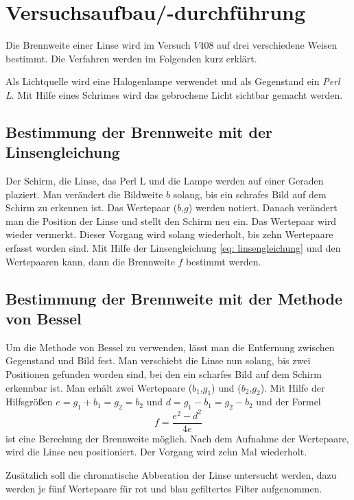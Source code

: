 \section{Versuchsaufbau/-durchführung}
Die Brennweite einer Linse wird im Versuch $V408$ auf drei
verschiedene Weisen bestimmt.
Die Verfahren werden im Folgenden kurz erklärt.

Als Lichtquelle wird eine Halogenlampe verwendet und als
Gegenstand ein \emph{Perl L}. Mit Hilfe eines Schrimes wird
das gebrochene Licht sichtbar gemacht werden.

\subsection{Bestimmung der Brennweite mit der Linsengleichung}

Der Schirm, die Linse, das Perl L und die Lampe werden auf einer
Geraden plaziert.
Man verändert die Bildweite $b$ solang, bis ein schrafes Bild auf dem
Schirm zu erkennen ist. Das Wertepaar ($b$,$g$) werden notiert.
Danach verändert man die Position der Linse und stellt den Schirm neu ein.
Das Wertepaar wird wieder vermerkt. Dieser Vorgang wird solang wiederholt, bis
zehn Wertepaare erfasst worden sind.
Mit Hilfe der Linsengleichung \eqref{eq: linsengleichung} und den Wertepaaren kann, dann die
Brennweite $f$ bestimmt werden.

\subsection{Bestimmung der Brennweite mit der Methode von Bessel}
Um die Methode von Bessel zu verwenden, lässt man die Entfernung zwischen
Gegenstand und Bild fest. Man verschiebt die Linse nun solang, bis zwei
Positionen gefunden worden sind, bei den ein scharfes Bild auf dem Schirm erkennbar ist.
Man erhält zwei Wertepaare ($b_1$,$g_1$) und ($b_2$,$g_2$).
Mit Hilfe der Hilfsgrößen $e=g_1+b_1=g_2=b_2$ und $d=g_1-b_1=g_2-b_2$ und der Formel
\begin{equation}
  \label{eq: bessel_methode}
  f=\frac{e^2-d^2}{4e}
\end{equation}
ist eine Berechung der Brennweite möglich.
Nach dem Aufnahme der Wertepaare, wird die Linse neu positioniert.
Der Vorgang wird zehn Mal wiederholt.

Zusätzlich soll die chromatische Abberation der Linse untersucht werden,
dazu werden je fünf Wertepaare für rot und blau gefiltertes Filter
aufgenommen.

